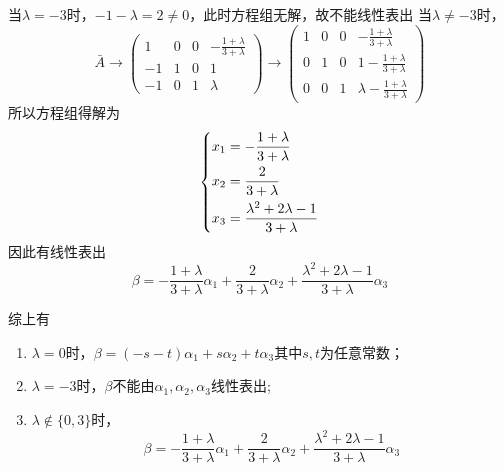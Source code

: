 \begin{solution}
\begin{enumerate}[(1)]
              \subitem 当$\lambda=-3$时，$-1-\lambda=2\neq 0$，此时方程组无解，故不能线性表出
              \subitem 当$\lambda\neq-3$时，
              \[
                  \bar{A}
                  \longrightarrow
                  \left(\begin{array}{ccc|c}
                          1  & 0 & 0 & -\frac{1+\lambda}{3+\lambda} \\
                          -1 & 1 & 0 & 1                            \\
                          -1 & 0 & 1 & \lambda
                      \end{array}\right)
                  \longrightarrow
                  \left(\begin{array}{ccc|c}
                          1 & 0 & 0 & -\frac{1+\lambda}{3+\lambda}         \\
                          0 & 1 & 0 & 1 -\frac{1+\lambda}{3+\lambda}       \\
                          0 & 0 & 1 & \lambda -\frac{1+\lambda}{3+\lambda}
                      \end{array}\right)
              \]
              所以方程组得解为
              \[
                  \begin{dcases}
                      x_1 = -\frac{1+\lambda}{3+\lambda} \\
                      x_2 = \frac{2}{3+\lambda}          \\
                      x_3 = \frac{\lambda^2+2\lambda-1}{3+\lambda}
                  \end{dcases}
              \]
              因此有线性表出
              \[\beta = -\frac{1+\lambda}{3+\lambda}\alpha_1 + \frac{2}{3+\lambda}\alpha_2 + \frac{\lambda^2+2\lambda-1}{3+\lambda}\alpha_3 \]
    \end{enumerate}
    综上有
    \begin{enumerate}[(1)]
        \item $\lambda=0$时，$\beta = (-s-t)\alpha_1+s\alpha_2+t\alpha_3$其中$s,t$为任意常数；
        \item $\lambda=-3$时，$\beta$不能由$\alpha_1,\alpha_2,\alpha_3$线性表出;
        \item $\lambda\notin\{0,3\}$时，
              \[ \beta = -\frac{1+\lambda}{3+\lambda}\alpha_1 + \frac{2}{3+\lambda}\alpha_2 + \frac{\lambda^2+2\lambda-1}{3+\lambda}\alpha_3 \]
    \end{enumerate}
\end{solution}


